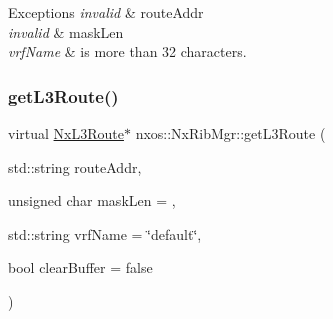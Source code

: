 \begin{DoxyExceptions}{Exceptions}
{\em invalid} & route\+Addr \\
\hline
{\em invalid} & mask\+Len \\
\hline
{\em vrf\+Name} & is more than 32 characters. \\
\hline
\end{DoxyExceptions}
\mbox{\label{classnxos_1_1_nx_rib_mgr_ae84cf1b9546fc3bf70e12bc7209ca190}} 
\subsubsection{\texorpdfstring{get\+L3\+Route()}{getL3Route()}}
{\footnotesize\ttfamily virtual \mbox{\hyperlink{classnxos_1_1_nx_l3_route}{Nx\+L3\+Route}}$\ast$ nxos\+::\+Nx\+Rib\+Mgr\+::get\+L3\+Route (\begin{DoxyParamCaption}\item[{std\+::string}]{route\+Addr,  }\item[{unsigned char}]{mask\+Len = {},  }\item[{std\+::string}]{vrf\+Name = {\ttfamily \char`\"{}default\char`\"{}},  }\item[{bool}]{clear\+Buffer = {\ttfamily false} }\end{DoxyParamCaption})\hspace{0.3cm}{\ttfamily [pure virtual]}}

